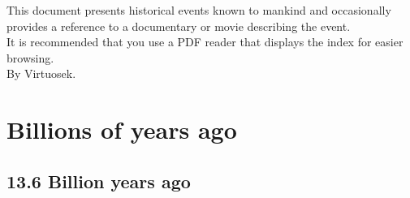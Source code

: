 \documentclass[11pt]{report}
\begin{document}
\begin{center}
\vspace*{\fill}
This document presents historical events known to mankind and occasionally provides a reference to a documentary or movie describing the event.\\
\vspace{5mm}
It is recommended that you use a PDF reader that displays the index for easier browsing.\\
\vspace{1cm}
By Virtuosek.\\ \vspace{5cm}
\end{center}

\vspace*{\fill}
\thispagestyle{empty}
\clearpage
\setcounter{page}{1}

\part{Billions of years ago}
\chapter{13.6 Billion years ago}
\end{document}
